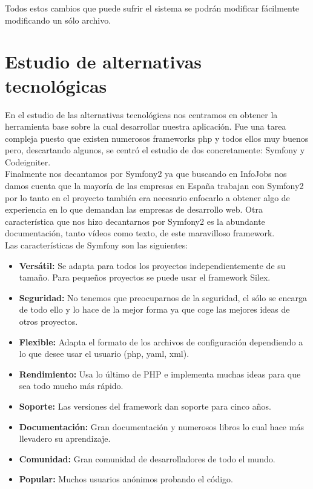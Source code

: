 Todos estos cambios que puede sufrir el sistema se podrán modificar fácilmente modificando un sólo archivo. 
 
\section{Estudio de alternativas tecnológicas}
En el estudio de las alternativas tecnológicas nos centramos en obtener la herramienta base sobre la cual desarrollar nuestra aplicación. Fue una tarea compleja puesto que existen numerosos frameworks php y todos ellos muy buenos pero, descartando algunos, se centró el estudio de dos concretamente: Symfony y Codeigniter.\\
Finalmente nos decantamos por Symfony2 ya que buscando en InfoJobs nos damos cuenta que la mayoría de las empresas en España trabajan con Symfony2 por lo tanto en el proyecto también era necesario enfocarlo a obtener algo de experiencia en lo que demandan las empresas de desarrollo web. Otra característica que nos hizo decantarnos por Symfony2 es la abundante documentación, tanto vídeos como texto, de este maravilloso framework.\\
Las características de Symfony son las siguientes:\\
\begin{itemize}
\item \textbf{Versátil:} Se adapta para todos los proyectos independientemente de su tamaño. Para pequeños proyectos se puede usar el framework Silex.
\item \textbf{Seguridad:} No tenemos que preocuparnos de la seguridad, el sólo se encarga de todo ello y lo hace de la mejor forma ya que coge las mejores ideas de otros proyectos.
\item \textbf{Flexible:} Adapta el formato de los archivos de configuración dependiendo a lo que desee usar el usuario (php, yaml, xml).
\item \textbf{Rendimiento:} Usa lo último de PHP e implementa muchas ideas para que sea todo mucho más rápido. 
\item \textbf{Soporte:} Las versiones del framework dan soporte para cinco años.
\item \textbf{Documentación:} Gran documentación y numerosos libros lo cual hace más llevadero su aprendizaje.
\item \textbf{Comunidad:} Gran comunidad de desarrolladores de todo el mundo.
\item \textbf{Popular:} Muchos usuarios anónimos probando el código.
\end{itemize}

